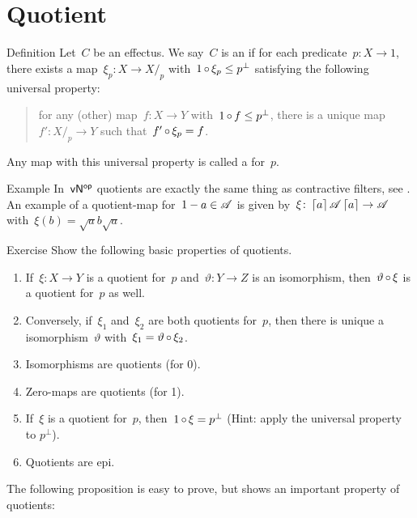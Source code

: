 \documentclass[b]{subfiles}
\begin{document}
\section{Quotient}
\begin{parsec}%
\begin{point}{Definition}%
Let~$C$ be an effectus.
We say~$C$ is an 
    if for each predicate~$p \colon X \to 1$,
    there exists a map~$\xi_p \colon X \to X/_p$
    with~$1 \mathop{\circ} \xi_p \leq p^\perp$
    satisfying the following universal property:
\begin{quote}
    for any (other) map~$f\colon X \to Y$
        with~$1 \mathop{\circ} f \leq p^\perp$,
        there is a unique map~$f' \colon X/_p \to Y$
        such that~$f' \mathop{\circ} \xi_p = f$.
\end{quote}
Any  map with this universal property
    is called a  for~$p$.
\end{point}
\begin{point}{Example}%
In~${\mathsf{vN}}{^{\mathsf{op}}}$ quotients are exactly the same thing
    as contractive filters, see .
An example of a quotient-map for~$1-a \in \mathscr{A}$ is given
    by~$\xi\colon \left\lceil a\right\rceil\mathscr{A} \left\lceil a\right\rceil \to \mathscr{A}$
    with~$\xi(b) = \sqrt{a} b \sqrt{a}$.
\end{point}
\begin{point}{Exercise}%
Show the following basic properties of quotients.
\begin{enumerate}
    \item If~$\xi\colon X \to Y$ is a quotient for~$p$
                and~$\vartheta\colon Y \to Z$ is an isomorphism,
                then~$\vartheta \mathop{\circ} \xi$ is a quotient for~$p$
                as well.
    \item Conversely, if~$\xi_1$ and~$\xi_2$
            are both quotients for~$p$,
            then there is unique a isomorphism~$\vartheta$
            with~$\xi_1 = \vartheta \mathop{\circ} \xi_2$.
    \item Isomorphisms are quotients (for 0).
    \item Zero-maps are quotients (for 1).
    \item If~$\xi$ is a quotient for~$p$, then~$1\mathop{\circ} \xi = p^\perp$
                (Hint: apply the universal property to $p^\perp$).
    \item Quotients are epi.
\end{enumerate}
\begin{point}%
The following proposition is easy to prove,
    but shows an important property of quotients:

\end{point}
\end{point}
\end{parsec}
\end{document}
